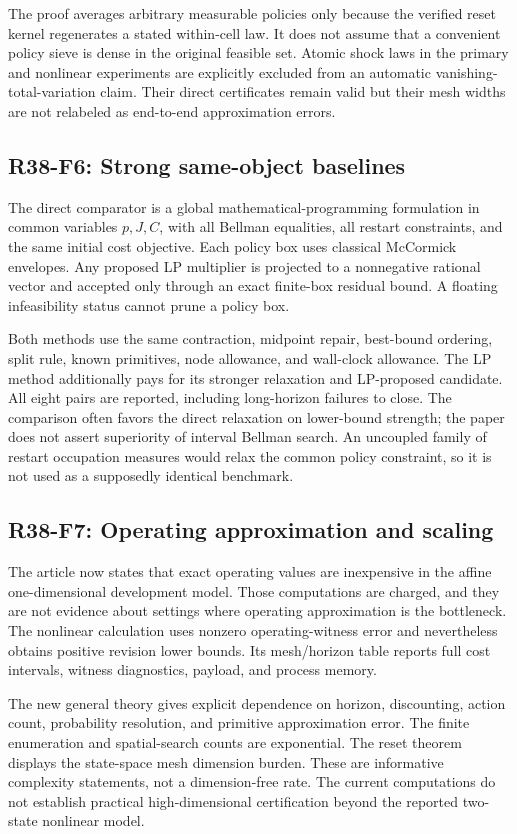 The proof averages arbitrary measurable policies only because the verified reset kernel regenerates a stated within-cell law. It does not assume that a convenient policy sieve is dense in the original feasible set. Atomic shock laws in the primary and nonlinear experiments are explicitly excluded from an automatic vanishing-total-variation claim. Their direct certificates remain valid but their mesh widths are not relabeled as end-to-end approximation errors.

\subsection{R38-F6: Strong same-object baselines}
The direct comparator is a global mathematical-programming formulation in common variables $p,J,C$, with all Bellman equalities, all restart constraints, and the same initial cost objective. Each policy box uses classical McCormick envelopes. Any proposed LP multiplier is projected to a nonnegative rational vector and accepted only through an exact finite-box residual bound. A floating infeasibility status cannot prune a policy box.

Both methods use the same contraction, midpoint repair, best-bound ordering, split rule, known primitives, node allowance, and wall-clock allowance. The LP method additionally pays for its stronger relaxation and LP-proposed candidate. All eight pairs are reported, including long-horizon failures to close. The comparison often favors the direct relaxation on lower-bound strength; the paper does not assert superiority of interval Bellman search. An uncoupled family of restart occupation measures would relax the common policy constraint, so it is not used as a supposedly identical benchmark.

\subsection{R38-F7: Operating approximation and scaling}
The article now states that exact operating values are inexpensive in the affine one-dimensional development model. Those computations are charged, and they are not evidence about settings where operating approximation is the bottleneck. The nonlinear calculation uses nonzero operating-witness error and nevertheless obtains positive revision lower bounds. Its mesh/horizon table reports full cost intervals, witness diagnostics, payload, and process memory.

The new general theory gives explicit dependence on horizon, discounting, action count, probability resolution, and primitive approximation error. The finite enumeration and spatial-search counts are exponential. The reset theorem displays the state-space mesh dimension burden. These are informative complexity statements, not a dimension-free rate. The current computations do not establish practical high-dimensional certification beyond the reported two-state nonlinear model.

